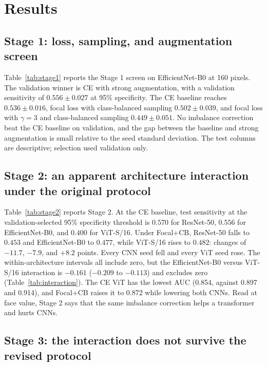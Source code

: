 \section{Results}

\subsection{Stage 1: loss, sampling, and augmentation screen}

Table~\ref{tab:stage1} reports the Stage 1 screen on EfficientNet-B0 at 160 pixels. The validation winner is CE with strong augmentation, with a validation sensitivity of $0.556\pm0.027$ at 95\% specificity. The CE baseline reaches $0.536\pm0.016$, focal loss with class-balanced sampling $0.502\pm0.039$, and focal loss with $\gamma=3$ and class-balanced sampling $0.449\pm0.051$. No imbalance correction beat the CE baseline on validation, and the gap between the baseline and strong augmentation is small relative to the seed standard deviation. The test columns are descriptive; selection used validation only.



\subsection{Stage 2: an apparent architecture interaction under the original protocol}

Table~\ref{tab:stage2} reports Stage 2. At the CE baseline, test sensitivity at the validation-selected 95\% specificity threshold is $0.570$ for ResNet-50, $0.556$ for EfficientNet-B0, and $0.400$ for ViT-S/16. Under Focal+CB, ResNet-50 falls to $0.453$ and EfficientNet-B0 to $0.477$, while ViT-S/16 rises to $0.482$: changes of $-11.7$, $-7.9$, and $+8.2$ points. Every CNN seed fell and every ViT seed rose. The within-architecture intervals all include zero, but the EfficientNet-B0 versus ViT-S/16 interaction is $-0.161$ ($-0.209$ to $-0.113$) and excludes zero (Table~\ref{tab:interaction}). The CE ViT has the lowest AUC (0.854, against 0.897 and 0.914), and Focal+CB raises it to 0.872 while lowering both CNNs. Read at face value, Stage 2 says that the same imbalance correction helps a transformer and hurts CNNs.



\subsection{Stage 3: the interaction does not survive the revised protocol}

